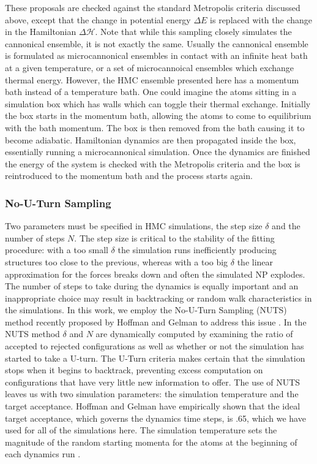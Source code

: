 These proposals are checked against the standard Metropolis criteria discussed above, except that the change in potential energy $\Delta E$ is replaced with the change in the Hamiltonian $\Delta \mathcal{H}$.
Note that while this sampling closely simulates the cannonical ensemble, it is not exactly the same.
Usually the cannonical ensemble is formulated as microcannonical ensembles in contact with an infinite heat bath at a given temperature, or a set of microcannoical ensembles which exchange thermal energy.
However, the HMC ensemble presented here has a momentum bath instead of a temperature bath.
One could imagine the atoms sitting in a simulation box which has walls which can toggle their thermal exchange.
Initially the box starts in the momentum bath, allowing the atoms to come to equilibrium with the bath momentum.
The box is then removed from the bath causing it to become adiabatic.
Hamiltonian dynamics are then propagated inside the box, essentially running a microcannonical simulation.
Once the dynamics are finished the energy of the system is checked with the Metropolis criteria and the box is reintroduced to the momentum bath and the process starts again.

\subsubsection{No-U-Turn Sampling}
Two parameters must be specified in HMC simulations, the step size $\delta$ and the number of steps $N$.
The step size is critical to the stability of the fitting procedure:  with a too small $\delta$ the simulation runs inefficiently producing structures too close to the previous, whereas with a too big $\delta$ the linear approximation for the forces breaks down and often the simulated NP explodes.
The number of steps to take during the dynamics is equally important and an inappropriate choice may result in backtracking or random walk characteristics in the simulations.
In this work, we employ the No-U-Turn Sampling (NUTS) method recently proposed by Hoffman and Gelman to address this issue \cite{Hoffman2014}.
In the NUTS method $\delta$ and $N$ are dynamically computed by examining the ratio of accepted to rejected configurations as well as whether or not the simulation has started to take a U-turn.
The U-Turn criteria makes certain that the simulation stops when it begins to backtrack, preventing excess computation on configurations that have very little new information to offer.
The use of NUTS leaves us with two simulation parameters: the simulation temperature and the target acceptance.
Hoffman and  Gelman have empirically shown that the ideal target acceptance, which governs the dynamics time steps, is .65, which we have used for all of the simulations here.
The simulation temperature sets the magnitude of the random starting momenta for the atoms at the beginning of each dynamics run \cite{Hoffman2014}.

